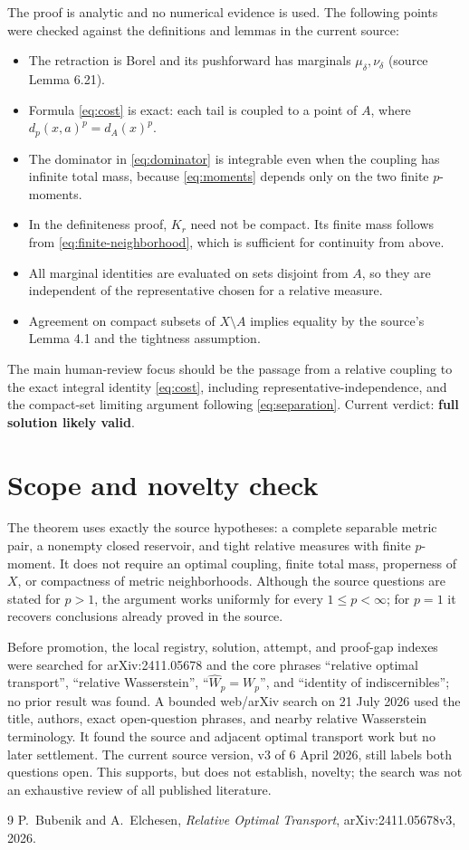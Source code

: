 \documentclass[11pt]{article}
\begin{document}
The proof is analytic and no numerical evidence is used.  The following
points were checked against the definitions and lemmas in the current source:
\begin{itemize}
  \item The retraction is Borel and its pushforward has marginals
  $\mu_\delta,\nu_\delta$ (source Lemma 6.21).
  \item Formula \eqref{eq:cost} is exact: each tail is coupled to a point of $A$, where
  $d_p(x,a)^p=d_A(x)^p$.
  \item The dominator in \eqref{eq:dominator} is integrable even when the coupling has infinite
  total mass, because \eqref{eq:moments} depends only on the two finite $p$-moments.
  \item In the definiteness proof, $K_r$ need not be compact.  Its finite mass
  follows from \eqref{eq:finite-neighborhood}, which is sufficient for continuity from above.
  \item All marginal identities are evaluated on sets disjoint from $A$, so
  they are independent of the representative chosen for a relative measure.
  \item Agreement on compact subsets of $X\setminus A$ implies equality by
  the source's Lemma 4.1 and the tightness assumption.
\end{itemize}

The main human-review focus should be the passage from a relative coupling to
the exact integral identity \eqref{eq:cost}, including representative-independence, and
the compact-set limiting argument following \eqref{eq:separation}.  Current verdict:
\textbf{full solution likely valid}.

\section{Scope and novelty check}

The theorem uses exactly the source hypotheses: a complete separable metric
pair, a nonempty closed reservoir, and tight relative measures with finite
$p$-moment.  It does not require an optimal coupling, finite total mass,
properness of $X$, or compactness of metric neighborhoods.  Although the
source questions are stated for $p>1$, the argument works uniformly for every
$1\leq p<\infty$; for $p=1$ it recovers conclusions already proved in the
source.

Before promotion, the local registry, solution, attempt, and proof-gap indexes
were searched for arXiv:2411.05678 and the core phrases ``relative optimal
transport'', ``relative Wasserstein'', ``$\widehat W_p=W_p$'', and ``identity
of indiscernibles''; no prior result was found.  A bounded web/arXiv search on
21 July 2026 used the title, authors, exact open-question phrases, and nearby
relative Wasserstein terminology.  It found the source and adjacent optimal
transport work but no later settlement.  The current source version, v3 of
6 April 2026, still labels both questions open.  This supports, but does not
establish, novelty; the search was not an exhaustive review of all published
literature.

\begin{thebibliography}{9}
P.~Bubenik and A.~Elchesen,
\emph{Relative Optimal Transport}, arXiv:2411.05678v3, 2026.
\end{thebibliography}
\end{document}
